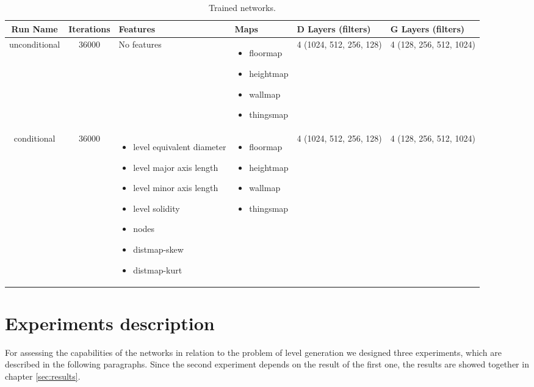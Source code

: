 \begin{table}[h!]
	\begin{tabularx}{\textwidth}{| c | c | X | X | X | X |}
		\hline
		\textbf{Run Name} & \textbf{Iterations} & \textbf{Features} & \textbf{Maps} & \textbf{D Layers (filters)} & \textbf{G Layers (filters)} \\
		\hline
		
		
		
		unconditional & 36000 & 
		No features
		& 
		\begin{itemize}
			\raggedright
			\small
			\item[] floormap
			\item[] heightmap
			\item[] wallmap
			\item[] thingsmap
		\end{itemize}
		& 4 (1024, 512, 256, 128) & 4 (128, 256, 512, 1024)\\
		
		\hline
	
		conditional & 36000 & 
		\begin{itemize}
			\raggedright
			\small
			\item[] level equivalent diameter
			\item[] level major axis length
			\item[] level minor axis length
			\item[] level solidity
			\item[] nodes
			\item[] distmap-skew
			\item[] distmap-kurt
		\end{itemize}
		& 
		\begin{itemize}
			\raggedright
			\small
			\item[] floormap
			\item[] heightmap
			\item[] wallmap
			\item[] thingsmap
		\end{itemize}
		& 4 (1024, 512, 256, 128) & 4 (128, 256, 512, 1024)\\
		
		\hline
		
	\end{tabularx}
	\caption[ Trained Models ]{ Trained networks. }
	\label{tab:trained_models}
\end{table}	

\section{Experiments description}
\label{sec:experiments}
For assessing the capabilities of the networks in relation to the problem of level generation we designed three experiments, which are described in the following paragraphs. Since the second experiment depends on the result of the first one, the results are showed together in chapter \ref{sec:results}.

